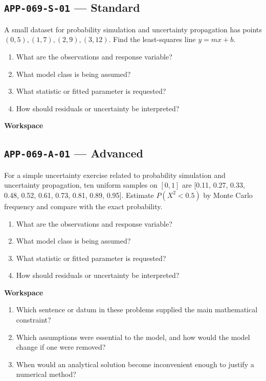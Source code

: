 \documentclass[11pt]{book}
\newcommand{\pid}[1]{\texttt{#1}}
\newcommand{\workspace}{\par\vspace{0.7in}\hrulefill\par\vspace{0.55in}\hrulefill\par}
\begin{document}
\subsection*{\pid{APP-069-S-01} — Standard}
\begin{problembox}
A small dataset for probability simulation and uncertainty propagation has points $(0,5),(1,7),(2,9),(3,12)$. Find the least-squares line $y=mx+b$.
\end{problembox}
\begin{promptbox}\begin{enumerate}
\item What are the observations and response variable?
\item What model class is being assumed?
\item What statistic or fitted parameter is requested?
\item How should residuals or uncertainty be interpreted?
\end{enumerate}\end{promptbox}
\textbf{Workspace}\workspace
{}
\subsection*{\pid{APP-069-A-01} — Advanced}
\begin{problembox}
For a simple uncertainty exercise related to probability simulation and uncertainty propagation, ten uniform samples on $[0,1]$ are [0.11, 0.27, 0.33, 0.48, 0.52, 0.61, 0.73, 0.81, 0.89, 0.95]. Estimate $P(X^2<0.5)$ by Monte Carlo frequency and compare with the exact probability.
\end{problembox}
\begin{promptbox}\begin{enumerate}
\item What are the observations and response variable?
\item What model class is being assumed?
\item What statistic or fitted parameter is requested?
\item How should residuals or uncertainty be interpreted?
\end{enumerate}\end{promptbox}
\textbf{Workspace}\workspace
\begin{reflectionbox}\begin{enumerate}
\item Which sentence or datum in these problems supplied the main mathematical constraint?
\item Which assumptions were essential to the model, and how would the model change if one were removed?
\item When would an analytical solution become inconvenient enough to justify a numerical method?
\end{enumerate}\end{reflectionbox}
\end{document}
